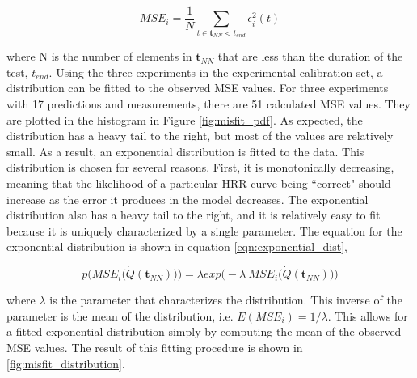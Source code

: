 \documentclass{article}
\begin{document}
\begin{equation}
  \label{eqn:MSE}
 MSE_i = \frac{1}{N}\sum_{t \in \boldsymbol{t}_{NN} < t_{end}} \epsilon^2_i(t)
\end{equation}

\noindent where N is the number of elements in $\boldsymbol{t}_{NN}$ that are less than the duration of the test, $t_{end}$. Using the three experiments in the experimental calibration set, a distribution can be fitted to the observed MSE values. For three experiments with 17 predictions and measurements, there are 51 calculated MSE values. They are plotted in the histogram in Figure \ref{fig:misfit_pdf}. As expected, the distribution has a heavy tail to the right, but most of the values are relatively small. As a result, an exponential distribution is fitted to the data. This distribution is chosen for several reasons. First, it is monotonically decreasing, meaning that the likelihood of a particular HRR curve being ``correct" should increase as the error it produces in the model decreases. The exponential distribution also has a heavy tail to the right, and it is relatively easy to fit because it is uniquely characterized by a single parameter. The equation for the exponential distribution is shown in equation \ref{eqn:exponential_dist},

\begin{equation}
  \label{eqn:exponential_dist}
 p\bigg(MSE_i\Big(\dot{Q}(\boldsymbol{t}_{NN}) \Big)  \bigg) =  \lambda exp\bigg(-\lambda \ MSE_i\Big(\dot{Q}(\boldsymbol{t}_{NN}) \Big)\bigg)
\end{equation}

where $\lambda$ is the parameter that characterizes the distribution. This inverse of the parameter is the mean of the distribution, i.e. $E(MSE_i)=1/\lambda$. This allows for a fitted exponential distribution simply by computing the mean of the observed MSE values. The result of this fitting procedure is shown in \ref{fig:misfit_distribution}.
\end{document}
